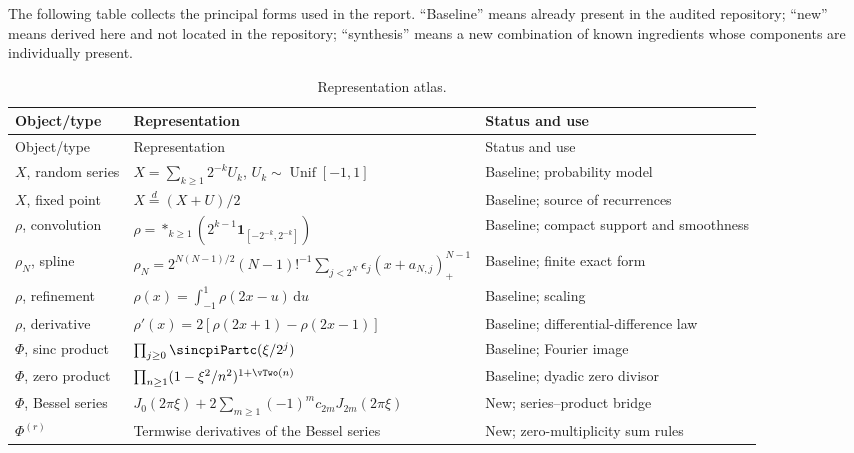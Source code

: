 \documentclass[11pt,oneside]{article}
\theoremstyle{definition}
\newcommand{\dd}{\,\mathrm d}
\begin{document}
The following table collects the principal forms used in the report. ``Baseline'' means
already present in the audited repository; ``new'' means derived here and not located in the
repository; ``synthesis'' means a new combination of known ingredients whose components are
individually present.

\small
\begin{longtable}{p{}p{}p{}}
\caption{Representation atlas.}\label{p4:tab:atlas}\\
\toprule
Object/type & Representation & Status and use\\
\midrule
\endfirsthead
\toprule
Object/type & Representation & Status and use\\
\midrule
\endhead
\bottomrule
\endfoot

\(X\), random series &
\(X=\sum_{k\ge1}2^{-k}U_k\), \(U_k\sim\operatorname{Unif}[-1,1]\) &
Baseline; probability model\\

\(X\), fixed point &
\(X\stackrel d=(X+U)/2\) &
Baseline; source of recurrences\\

\(\rho\), convolution &
\(\rho=*_{k\ge1}(2^{k-1}\mathbf1_{[-2^{-k},2^{-k}]})\) &
Baseline; compact support and smoothness\\

\(\rho_N\), spline &
\(\rho_N=2^{N(N-1)/2}(N-1)!^{-1}\sum_{j<2^N}\epsilon_j(x+a_{N,j})_+^{N-1}\) &
Baseline; finite exact form\\

\(\rho\), refinement &
\(\rho(x)=\int_{-1}^{1}\rho(2x-u)\dd u\) &
Baseline; scaling\\

\(\rho\), derivative &
\(\rho'(x)=2[\rho(2x+1)-\rho(2x-1)]\) &
Baseline; differential-difference law\\

\(\Phi\), sinc product &
\(\prod_{j\ge0}\sincpiPartc(\xi/2^j)\) &
Baseline; Fourier image\\

\(\Phi\), zero product &
\(\prod_{n\ge1}(1-\xi^2/n^2)^{1+\vTwo(n)}\) &
Baseline; dyadic zero divisor\\

\(\Phi\), Bessel series &
\(J_0(2\pi\xi)+2\sum_{m\ge1}(-1)^mc_{2m}J_{2m}(2\pi\xi)\) &
New; series--product bridge\\

\(\Phi^{(r)}\) &
Termwise derivatives of the Bessel series &
New; zero-multiplicity sum rules\\


\end{longtable}
\end{document}
